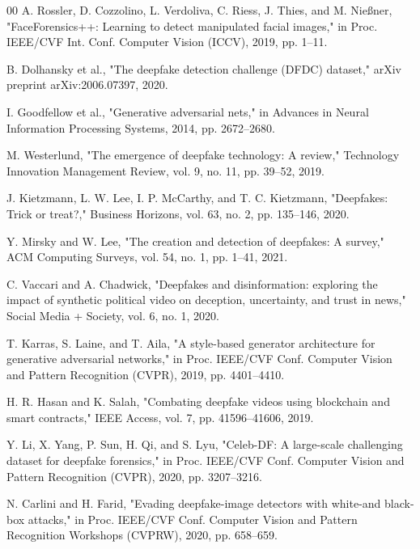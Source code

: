 \documentclass[conference]{IEEEtran}
\begin{document}
\begin{thebibliography}{00}
 A. Rossler, D. Cozzolino, L. Verdoliva, C. Riess, J. Thies, and M. Nießner, "FaceForensics++: Learning to detect manipulated facial images," in Proc. IEEE/CVF Int. Conf. Computer Vision (ICCV), 2019, pp. 1–11.

 B. Dolhansky et al., "The deepfake detection challenge (DFDC) dataset," arXiv preprint arXiv:2006.07397, 2020.

 I. Goodfellow et al., "Generative adversarial nets," in Advances in Neural Information Processing Systems, 2014, pp. 2672–2680.

 M. Westerlund, "The emergence of deepfake technology: A review," Technology Innovation Management Review, vol. 9, no. 11, pp. 39–52, 2019.

 J. Kietzmann, L. W. Lee, I. P. McCarthy, and T. C. Kietzmann, "Deepfakes: Trick or treat?," Business Horizons, vol. 63, no. 2, pp. 135–146, 2020.

 Y. Mirsky and W. Lee, "The creation and detection of deepfakes: A survey," ACM Computing Surveys, vol. 54, no. 1, pp. 1–41, 2021.

 C. Vaccari and A. Chadwick, "Deepfakes and disinformation: exploring the impact of synthetic political video on deception, uncertainty, and trust in news," Social Media + Society, vol. 6, no. 1, 2020.

 T. Karras, S. Laine, and T. Aila, "A style-based generator architecture for generative adversarial networks," in Proc. IEEE/CVF Conf. Computer Vision and Pattern Recognition (CVPR), 2019, pp. 4401–4410.

 H. R. Hasan and K. Salah, "Combating deepfake videos using blockchain and smart contracts," IEEE Access, vol. 7, pp. 41596–41606, 2019.

 Y. Li, X. Yang, P. Sun, H. Qi, and S. Lyu, "Celeb-DF: A large-scale challenging dataset for deepfake forensics," in Proc. IEEE/CVF Conf. Computer Vision and Pattern Recognition (CVPR), 2020, pp. 3207–3216.

 N. Carlini and H. Farid, "Evading deepfake-image detectors with white-and black-box attacks," in Proc. IEEE/CVF Conf. Computer Vision and Pattern Recognition Workshops (CVPRW), 2020, pp. 658–659.


\end{thebibliography}
\end{document}
